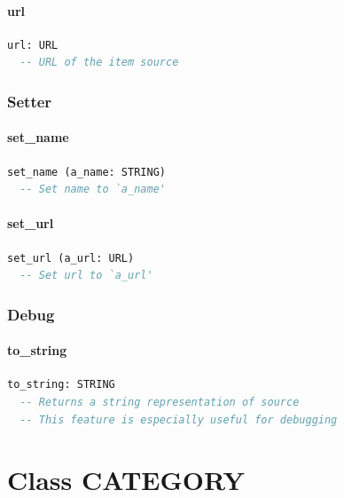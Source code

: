 \subsubsection{url}

\begin{lstlisting}[language=Eiffel]
url: URL
  -- URL of the item source
\end{lstlisting}

\subsection{Setter}
\label{sec:item-source-setter}

\subsubsection{set\_name}

\begin{lstlisting}[language=Eiffel]
set_name (a_name: STRING)
  -- Set name to `a_name'
\end{lstlisting}

\subsubsection{set\_url}

\begin{lstlisting}[language=Eiffel]
set_url (a_url: URL)
  -- Set url to `a_url'
\end{lstlisting}

\subsection{Debug}
\label{sec:item-source-debug}

\subsubsection{to\_string}

\begin{lstlisting}[language=Eiffel]
to_string: STRING
  -- Returns a string representation of source
  -- This feature is especially useful for debugging
\end{lstlisting}


\chapter{Class CATEGORY}
\label{sec:feed-category}


